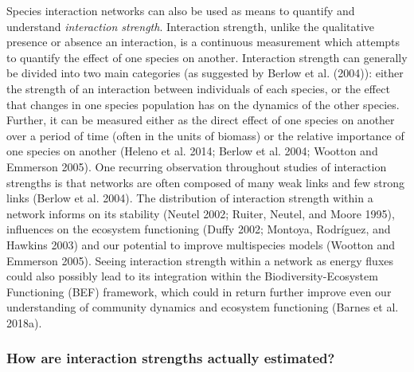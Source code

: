 \documentclass[10pt,oneside]{article}
\begin{document}
Species interaction networks can also be used as means to quantify and
understand \emph{interaction strength}. Interaction strength, unlike the
qualitative presence or absence an interaction, is a continuous
measurement which attempts to quantify the effect of one species on
another. Interaction strength can generally be divided into two main
categories (as suggested by Berlow et al. (2004)): either the strength
of an interaction between individuals of each species, or the effect
that changes in one species population has on the dynamics of the other
species. Further, it can be measured either as the direct effect of one
species on another over a period of time (often in the units of biomass)
or the relative importance of one species on another (Heleno et al.
2014; Berlow et al. 2004; Wootton and Emmerson 2005). One recurring
observation throughout studies of interaction strengths is that networks
are often composed of many weak links and few strong links (Berlow et
al. 2004). The distribution of interaction strength within a network
informs on its stability (Neutel 2002; Ruiter, Neutel, and Moore 1995),
influences on the ecosystem functioning (Duffy 2002; Montoya, Rodríguez,
and Hawkins 2003) and our potential to improve multispecies models
(Wootton and Emmerson 2005). Seeing interaction strength within a
network as energy fluxes could also possibly lead to its integration
within the Biodiversity-Ecosystem Functioning (BEF) framework, which
could in return further improve even our understanding of community
dynamics and ecosystem functioning (Barnes et al. 2018a).

\hypertarget{how-are-interaction-strengths-actually-estimated}{%
\subsubsection{How are interaction strengths actually
estimated?}\label{how-are-interaction-strengths-actually-estimated}}
\end{document}
